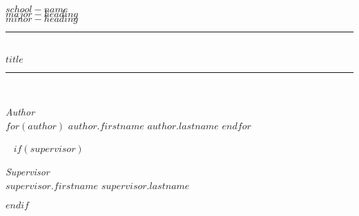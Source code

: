 \begin{titlepage} %
	\newcommand{\HRule}{\rule{\linewidth}{0.5mm}} %
	
	\center %
	
	
	\textsc{\LARGE $school-name$}\\[1.5cm] %
	
	\textsc{\Large $major-heading$}\\[0.5cm] %
	
	\textsc{\large $minor-heading$}\\[0.5cm] %
	
	
	\HRule\\[0.4cm]
	
	{\huge\bfseries $title$}\\[0.4cm] %
	
	\HRule\\[1.5cm]
	
	
	\begin{minipage}{0.4\textwidth}
		\begin{flushleft}
			\large
			\textit{Author}\\
            $for(author)$
			$author.firstname$ \textsc{$author.lastname$}
            $endfor$
		\end{flushleft}
	\end{minipage}
	~
    $if(supervisor)$
	\begin{minipage}{0.4\textwidth}
		\begin{flushright}
			\large
			\textit{Supervisor}\\
		    $supervisor.firstname$ \textsc{$supervisor.lastname$} 
		\end{flushright}
	\end{minipage}
    $endif$
	
	

\end{titlepage}
